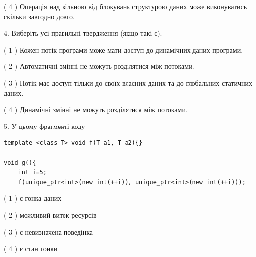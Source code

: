 \documentclass[12pt, ukrainian]{article}
\begin{document}
\begin {large}
{( 4 ) Операція над вільною від блокувань структурою даних може виконуватись скільки завгодно довго.%


4. Виберіть усі правильні твердження (якщо такі є).\par
\vspace{2mm}

( 1 ) Кожен потік програми може мати доступ до динамічних даних програми.%

( 2 ) Автоматичні змінні не можуть розділятися між потоками.%

( 3 ) Потік має доступ тільки до своїх власних даних та до глобальних статичних даних.%

( 4 ) Динамічні змінні не можуть розділятися між потоками.%


5. У цьому фрагменті коду
\begin{verbatim}
template <class T> void f(T a1, T a2){}

void g(){
    int i=5;
    f(unique_ptr<int>(new int(++i)), unique_ptr<int>(new int(++i)));
\end{verbatim}

( 1 ) є гонка даних%

( 2 ) можливий виток ресурсів%

( 3 ) є невизначена поведінка%

( 4 ) є стан гонки%
}
\end {large}

\newpage
\end{document}
